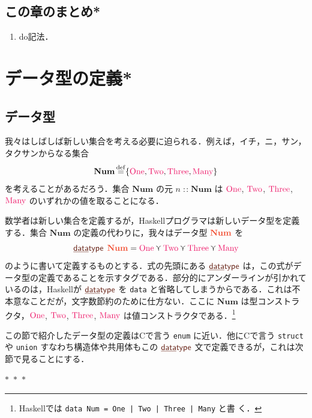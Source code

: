 \documentclass[a5paper,twoside,fleqn,draft]{jsbook}
\def\constantColor{WildStrawberry}
\def\keywordColor{Sepia}
\def\typeColor{RedOrange}
\newcommand{\separator}{\begin{center}$*$~$*$~$*$\end{center}}
\newcommand{\programminglanguage}[1]{\textsf{#1}}
\newcommand{\clang}{\programminglanguage{C}}
\newcommand{\haskell}{\programminglanguage{Haskell}}
\newcommand{\keyword}[1]{{\underline{\textbf{#1}}}}
\newcommand{\code}[1]{\texttt{#1}}
\newcommand{\mKeyword}[1]{\textcolor{\keywordColor}{\mathsf{#1}}}
\newcommand{\mKeywordUnderline}[1]{\textcolor{\keywordColor}{\text{\underline{\textsf{#1}}}}}
\newcommand{\mDataTypeKeyword}{\mKeywordUnderline{data}\mKeyword{type}}
\DeclareMathOperator{\mDataType}{\mDataTypeKeyword}
\newcommand{\mSpecialConstant}[1]{\textcolor{\constantColor}{\textrm{#1}}}
\newcommand{\mNumOne}{\mSpecialConstant{One}}
\newcommand{\mNumTwo}{\mSpecialConstant{Two}}
\newcommand{\mNumThree}{\mSpecialConstant{Three}}
\newcommand{\mNumMany}{\mSpecialConstant{Many}}
\DeclareMathOperator{\mDefEq}{\stackrel{\mathrm{def}}{=}}
\DeclareMathOperator{\mIn}{{:\!:}}
\DeclareMathOperator{\mValueOr}{\curlyvee}
\newcommand{\mSet}[1]{\mathbf{#1}}
\newcommand{\mType}[1]{\textcolor{\typeColor}{\mathbf{#1}}}
\begin{document}
\section{この章のまとめ*}

\begin{enumerate}
\item do記法．
\end{enumerate}

\chapter{データ型の定義*}
\label{ch:data-type}

\section{データ型}

我々はしばしば新しい集合を考える必要に迫られる．例えば，イチ，ニ，サン，タクサンからなる集合
\begin{equation}
\mSet{Num}\mDefEq\{\mNumOne,\mNumTwo,\mNumThree,\mNumMany\}
\end{equation}
を考えることがあるだろう．集合 $\mSet{Num}$ の元 $n\mIn\mSet{Num}$ は $\mNumOne$, $\mNumTwo$, $\mNumThree$, $\mNumMany$ のいずれかの値を取ることになる．

数学者は新しい集合を定義するが，\haskell プログラマは新しいデータ型を定義する．集合 $\mSet{Num}$ の定義の代わりに，我々はデータ型
$\mType{Num}$ を
\begin{equation}
  \mDataType\;\mType{Num}
  =\mNumOne\mValueOr\mNumTwo\mValueOr\mNumThree\mValueOr\mNumMany
\end{equation}
のように書いて定義するものとする．式の先頭にある $\mDataType$ は，この式がデータ型の定義であることを示すタグである．部分的にアンダーラインが引かれているのは，\haskell が $\mDataType$ を \code{data} と省略してしまうからである．これは不本意なことだが，文字数節約のために仕方ない．ここに $\mSet{Num}$ は型コンストラクタ，$\mNumOne$, $\mNumTwo$, $\mNumThree$, $\mNumMany$ は値コンストラクタである．\footnote{\haskell では \code{data Num = One | Two | Three | Many} と書
  く．}


この節で紹介したデータ型の定義は\clang で言う \code{enum} に近い．他に\clang で言う \code{struct} や \code{union} すなわち構造体や共用体もこの $\mDataType$ 文で定義できるが，これは次節で見ることにする．

\separator
\end{document}
